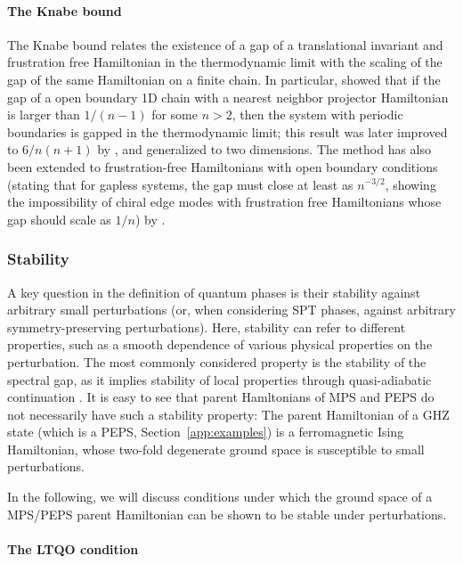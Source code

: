 \documentclass[rmp,aps,reprint,superscriptaddress,nobalancelastpage]{revtex4-1}
\begin{document}
\paragraph{The Knabe bound} The Knabe bound relates the existence of a gap of a translational invariant and frustration free Hamiltonian in the thermodynamic limit with the scaling of the gap of the same  Hamiltonian on a finite chain.  In particular, \textcite{knabe:knabe-bound} showed that if the gap of a open boundary 1D chain with a nearest neighbor projector Hamiltonian is larger than $1/(n-1)$  for some $n>2$, then the system with periodic boundaries is gapped in the thermodynamic limit; this result was later improved  to $6/n(n+1)$ by \textcite{gosset:knabe-bound}, and generalized to two dimensions. The method has also been extended to frustration-free Hamiltonians with open boundary conditions (stating that for gapless systems, the gap must close at least as $n^{-3/2}$, showing the impossibility of chiral edge modes with frustration free Hamiltonians whose gap should scale as $1/n$) by \citet{mozgunov:knabe-bound-chiral}.






\subsubsection{Stability}

A key question in the definition of quantum phases is their stability against arbitrary small perturbations (or, when considering SPT phases, against arbitrary symmetry-preserving perturbations). Here, stability can refer to different properties, such as a smooth dependence of various physical properties on the perturbation.  The most commonly considered property is the stability of the spectral gap, as it implies stability of local properties through quasi-adiabatic continuation \cite{hastings:quasi-adiabatic}. It is easy to see that parent Hamltonians of MPS and PEPS do not necessarily have such a stability property: The parent Hamiltonian of a GHZ state (which is a PEPS, Section~\ref{app:examples}) is a ferromagnetic Ising Hamiltonian, whose two-fold degenerate ground space is susceptible to small perturbations.

In the following, we will discuss conditions under which the ground space of a MPS/PEPS parent Hamiltonian can be shown to be stable under perturbations.


\paragraph{The LTQO condition}
\end{document}
